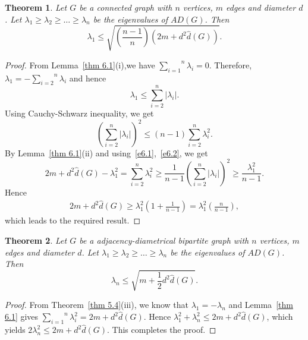\documentclass[12pt]{article}
\numberwithin{equation}{section}
\newtheorem{thm}{Theorem}[section]
\begin{document}
	\begin{thm}
		Let $G$ be a connected graph with $n$ vertices, $m$ edges and diameter $d$. Let $\lambda_1 \ge \lambda_2 \ge \dots \ge \lambda_n$ be the eigenvalues of $AD(G)$. Then 
		\begin{equation*}
			\lambda_1 \le \sqrt{ \left(\frac{n-1}{n}\right) (2m+d^{2}\hat{d}(G))}.
		\end{equation*}
	\end{thm}
	\begin{proof}
		From Lemma~\ref{thm 6.1}(i),we have $\overset{n}{\underset{i=1}{\sum}}\lambda_{i}=0$. %
		Therefore, $\lambda_1=- \overset{n}{\underset{i=2 }{\sum}}\lambda_{i}$ and hence
		\begin{equation}\label{e6.1}
			\lambda_1\leq \sum_{i=2}^{n} |\lambda_{i}|.
		\end{equation}
	Using Cauchy-Schwarz inequality, we get
		\begin{equation}\label{e6.2}
			\left(\overset{n}{\underset{i=2 }{\sum}}|\lambda_{i}|\right)^2 \leq (n-1) \overset{n}{\underset{i=2 }{\sum}}\lambda^2_{i}.
		\end{equation} 
		By Lemma~\ref{thm 6.1}(ii) and using~\eqref{e6.1},~\eqref{e6.2}, we get
		\[
		2m+d^2\hat{d}(G)-\lambda^{2}_1 =\sum_{i=2}^{n} \lambda^2_{i}
		\geq\frac{1}{n-1}\left(\sum_{i=2}^{n} |\lambda_{i}|\right)^2 
		\geq\frac{\lambda^{2}_1}{n-1}.\]
		Hence 
		\begin{eqnarray*}
			2m+d^2\hat{d}(G)\geq \lambda^2_{1}\left(1+\frac{1}{n-1}\right)=\lambda^2_{1}\left(\frac{n}{n-1}\right),
		\end{eqnarray*}
		which leads to the required result.
	\end{proof}
	
	\begin{thm}
		Let $G$ be a adjacency-diametrical bipartite graph with $n$ vertices, $m$ edges and diameter $d$. Let $\lambda_1 \geq \lambda_2 \geq \dots \geq \lambda_n$ be the eigenvalues of $AD(G)$. Then 
		\[\lambda_n \leq \sqrt{m+\frac{1}{2}d^2\hat{d}(G)}.\]
	\end{thm}
	\begin{proof}
	From Theorem~\ref{thm 5.4}(iii), we know that $\lambda_1=-\lambda_n$ and Lemma~\ref{thm 6.1} gives $\overset{n}{\underset{i=1}{\sum}}\lambda^2_{i}=2m+d^{2}\hat{d}(G)$.
		Hence
			$\lambda_1^{2}+\lambda_n^{2} \leq 2m+d^{2}\hat{d}(G)$,
	which yields		$2\lambda_n^{2}\leq 2m+d^{2}\hat{d}(G)$.	
		This completes the proof.
	\end{proof}
	
\end{document}
